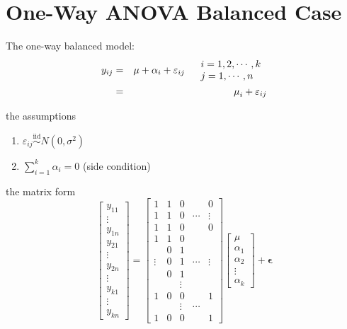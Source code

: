 \documentclass{article}
\begin{document}
\section{One-Way ANOVA Balanced Case}

The one-way balanced model:%
\begin{eqnarray*}
y_{ij} &=&\mu +\alpha _{i}+\varepsilon _{ij}\quad 
\begin{tabular}{l}
$i=1,2,\cdots ,k$ \\ 
$j=1,\cdots ,n$%
\end{tabular}
\\
&=&\mu _{i}+\varepsilon _{ij}
\end{eqnarray*}

the assumptions

\begin{enumerate}
\item $\varepsilon _{ij}\overset{\text{iid}}{\sim }N\left( 0,\sigma
^{2}\right) $

\item $\sum\limits_{i=1}^{k}\alpha _{i}=0$ (side condition)
\end{enumerate}

\bigskip

the matrix form%
\begin{equation*}
\left[ 
\begin{array}{c}
y_{11} \\ 
\vdots \\ 
y_{1n} \\ 
y_{21} \\ 
\vdots \\ 
y_{2n} \\ 
\vdots \\ 
y_{k1} \\ 
\vdots \\ 
y_{kn}%
\end{array}%
\right] =\left[ 
\begin{array}{ccccc}
1 & 1 & 0 &  & 0 \\ 
1 & 1 & 0 & \cdots & \vdots \\ 
1 & 1 & 0 &  & 0 \\ 
1 & 1 & 0 &  &  \\ 
& 0 & 1 &  &  \\ 
\vdots & 0 & 1 & \cdots & \vdots \\ 
& 0 & 1 &  &  \\ 
&  & \vdots &  &  \\ 
1 & 0 & 0 &  & 1 \\ 
&  & \vdots & \cdots &  \\ 
1 & 0 & 0 &  & 1%
\end{array}%
\right] \left[ 
\begin{array}{c}
\mu \\ 
\alpha _{1} \\ 
\alpha _{2} \\ 
\vdots \\ 
\alpha _{k}%
\end{array}%
\right] +\mathbf{\epsilon }
\end{equation*}
\end{document}
